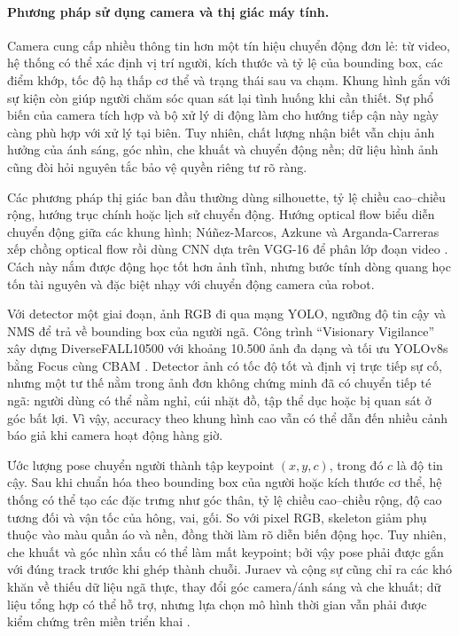 \paragraph{Phương pháp sử dụng camera và thị giác máy tính.}
Camera cung cấp nhiều thông tin hơn một tín hiệu chuyển động đơn lẻ: từ video, hệ thống có thể xác định vị trí người, kích thước và tỷ lệ của bounding box, các điểm khớp, tốc độ hạ thấp cơ thể và trạng thái sau va chạm. Khung hình gắn với sự kiện còn giúp người chăm sóc quan sát lại tình huống khi cần thiết. Sự phổ biến của camera tích hợp và bộ xử lý di động làm cho hướng tiếp cận này ngày càng phù hợp với xử lý tại biên. Tuy nhiên, chất lượng nhận biết vẫn chịu ảnh hưởng của ánh sáng, góc nhìn, che khuất và chuyển động nền; dữ liệu hình ảnh cũng đòi hỏi nguyên tắc bảo vệ quyền riêng tư rõ ràng.

Các phương pháp thị giác ban đầu thường dùng silhouette, tỷ lệ chiều cao--chiều rộng, hướng trục chính hoặc lịch sử chuyển động. Hướng optical flow biểu diễn chuyển động giữa các khung hình; Núñez-Marcos, Azkune và Arganda-Carreras xếp chồng optical flow rồi dùng CNN dựa trên VGG-16 để phân lớp đoạn video . Cách này nắm được động học tốt hơn ảnh tĩnh, nhưng bước tính dòng quang học tốn tài nguyên và đặc biệt nhạy với chuyển động camera của robot.

Với detector một giai đoạn, ảnh RGB đi qua mạng YOLO, ngưỡng độ tin cậy và NMS để trả về bounding box của người ngã. Công trình ``Visionary Vigilance'' xây dựng DiverseFALL10500 với khoảng 10.500 ảnh đa dạng và tối ưu YOLOv8s bằng Focus cùng CBAM . Detector ảnh có tốc độ tốt và định vị trực tiếp sự cố, nhưng một tư thế nằm trong ảnh đơn không chứng minh đã có chuyển tiếp té ngã: người dùng có thể nằm nghỉ, cúi nhặt đồ, tập thể dục hoặc bị quan sát ở góc bất lợi. Vì vậy, accuracy theo khung hình cao vẫn có thể dẫn đến nhiều cảnh báo giả khi camera hoạt động hàng giờ.

Ước lượng pose chuyển người thành tập keypoint $(x,y,c)$, trong đó $c$ là độ tin cậy. Sau khi chuẩn hóa theo bounding box của người hoặc kích thước cơ thể, hệ thống có thể tạo các đặc trưng như góc thân, tỷ lệ chiều cao--chiều rộng, độ cao tương đối và vận tốc của hông, vai, gối. So với pixel RGB, skeleton giảm phụ thuộc vào màu quần áo và nền, đồng thời làm rõ diễn biến động học. Tuy nhiên, che khuất và góc nhìn xấu có thể làm mất keypoint; bởi vậy pose phải được gắn với đúng track trước khi ghép thành chuỗi. Juraev và cộng sự cũng chỉ ra các khó khăn về thiếu dữ liệu ngã thực, thay đổi góc camera/ánh sáng và che khuất; dữ liệu tổng hợp có thể hỗ trợ, nhưng lựa chọn mô hình thời gian vẫn phải được kiểm chứng trên miền triển khai .

